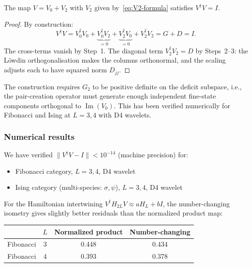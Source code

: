\begin{proposition}
\label{prop:number-changing}
The map $V = V_0 + V_2$ with $V_2$ given by~\eqref{eq:V2-formula} satisfies $V^\dagger V = I$.
\end{proposition}

\begin{proof}
By construction:
\begin{equation}
    V^\dagger V = V_0^\dagger V_0 + \underbrace{V_0^\dagger V_2}_{= 0} + \underbrace{V_2^\dagger V_0}_{= 0} + V_2^\dagger V_2 = G + D = I.
\end{equation}
The cross-terms vanish by Step~1. The diagonal term $V_2^\dagger V_2 = D$ by Steps~2--3: the L\"owdin orthogonalisation makes the columns orthonormal, and the scaling adjusts each to have squared norm $D_{jj}$.
\end{proof}

\begin{remark}
The construction requires $G_2$ to be positive definite on the deficit subspace, i.e., the pair-creation operator must generate enough independent fine-state components orthogonal to $\operatorname{Im}(V_0)$. This has been verified numerically for Fibonacci and Ising at $L = 3, 4$ with D4 wavelets.
\end{remark}

\subsubsection{Numerical results}

We have verified $\|V^\dagger V - I\| < 10^{-14}$ (machine precision) for:
\begin{itemize}
    \item Fibonacci category, $L = 3, 4$, D4 wavelet
    \item Ising category (multi-species: $\sigma, \psi$), $L = 3, 4$, D4 wavelet
\end{itemize}

\noindent
For the Hamiltonian intertwining $V^\dagger H_{2L} V \approx a H_L + b I$, the number-changing isometry gives slightly better residuals than the normalized product map:

\begin{center}
\begin{tabular}{lccc}
& $L$ & Normalized product & Number-changing \\
\hline
Fibonacci & 3 & 0.448 & 0.434 \\
Fibonacci & 4 & 0.393 & 0.378
\end{tabular}
\end{center}

